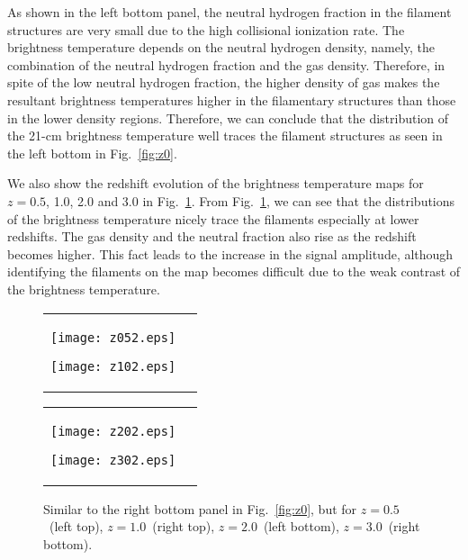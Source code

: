 \documentclass[a4paper,fleqn,usenatbib,useAMS]{mnras}
\begin{document}
As shown in the left bottom panel, the neutral hydrogen fraction
in the filament structures are very small due to the high collisional ionization rate. 
The brightness temperature depends on the neutral hydrogen
density, namely, the combination of the neutral hydrogen fraction and
the gas density.
Therefore,
in spite of the low neutral hydrogen fraction, the higher density of gas makes the resultant brightness temperatures higher in the filamentary structures than those in the lower density regions.
Therefore, we can conclude that the distribution of the 21-cm brightness temperature well traces the filament structures as seen in the left bottom in Fig.~\ref{fig:z0}. 

We also show the redshift evolution of the brightness temperature maps for $z=0.5$, 1.0, 2.0 and 3.0 in Fig.~\ref{fig:deltaTb}. 
From Fig.~\ref{fig:deltaTb}, we can see that the distributions of the brightness temperature nicely trace the filaments especially at lower redshifts.
The gas density and the neutral fraction also rise as the redshift becomes higher. 
This fact leads to the increase in the signal amplitude, although identifying the filaments on the map becomes difficult due to the weak contrast of the brightness temperature. 

\begin{figure}
    \begin{tabular}{cc}
 \begin{minipage}[b]{0.5\linewidth}
    \centering
    \texttt{[image: z052.eps]}
 \end{minipage}
  \begin{minipage}[b]{0.5\linewidth}
    \centering
    \texttt{[image: z102.eps]}
  \end{minipage}
     \end{tabular}
         \begin{tabular}{cc}
  \begin{minipage}[b]{0.5\linewidth}
    \centering
    \texttt{[image: z202.eps]}
  \end{minipage}
  \begin{minipage}[b]{0.5\linewidth}
    \centering
    \texttt{[image: z302.eps]}
  \end{minipage}
	  \end{tabular}
  \caption{Similar to the right bottom panel in Fig.~\ref{fig:z0}, but for $z=0.5$~(left top), $z=1.0$~(right top), $z=2.0$~(left bottom), $z=3.0$~(right bottom). }\label{fig:deltaTb}
\end{figure}
\end{document}
